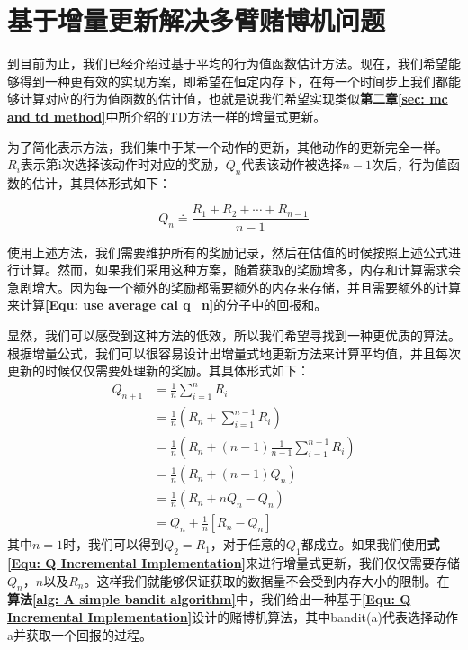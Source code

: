 \section{基于增量更新解决多臂赌博机问题}
到目前为止，我们已经介绍过基于平均的行为值函数估计方法。现在，我们希望能够得到一种更有效的实现方案，即希望在恒定内存下，在每一个时间步上我们都能够计算对应的行为值函数的估计值，也就是说我们希望实现类似\textbf{第二章\ref{sec: mc and td method}}中所介绍的TD方法一样的增量式更新。

为了简化表示方法，我们集中于某一个动作的更新，其他动作的更新完全一样。$R_i$表示第i次选择该动作时对应的奖励，$Q_n$代表该动作被选择$n-1$次后，行为值函数的估计，其具体形式如下：

\begin{equation}
\label{Equ: use average cal q_n}
    Q_{n} \doteq \frac{R_{1}+R_{2}+\cdots+R_{n-1}}{n-1}
\end{equation}

使用上述方法，我们需要维护所有的奖励记录，然后在估值的时候按照上述公式进行计算。然而，如果我们采用这种方案，随着获取的奖励增多，内存和计算需求会急剧增大。因为每一个额外的奖励都需要额外的内存来存储，并且需要额外的计算来计算\textbf{\eqref{Equ: use average cal q_n}}的分子中的回报和。

 显然，我们可以感受到这种方法的低效，所以我们希望寻找到一种更优质的算法。根据增量公式，我们可以很容易设计出增量式地更新方法来计算平均值，并且每次更新的时候仅仅需要处理新的奖励。其具体形式如下：
\begin{equation}
\label{Equ: Q Incremental Implementation}
    \begin{aligned}
Q_{n+1} &=\frac{1}{n} \sum_{i=1}^{n} R_{i} \\
&=\frac{1}{n}\left(R_{n}+\sum_{i=1}^{n-1} R_{i}\right) \\
&=\frac{1}{n}\left(R_{n}+(n-1) \frac{1}{n-1} \sum_{i=1}^{n-1} R_{i}\right) \\
&=\frac{1}{n}\left(R_{n}+(n-1) Q_{n}\right) \\
&=\frac{1}{n}\left(R_{n}+n Q_{n}-Q_{n}\right) \\
&=Q_{n}+\frac{1}{n}\left[R_{n}-Q_{n}\right]
\end{aligned}
\end{equation}
其中$n=1$时，我们可以得到$Q_2=R_1$，对于任意的$Q_1$都成立。如果我们使用\textbf{式\eqref{Equ: Q Incremental Implementation}}来进行增量式更新，我们仅仅需要存储$Q_n$，$n$以及$R_n$。这样我们就能够保证获取的数据量不会受到内存大小的限制。在\textbf{算法\ref{alg: A simple bandit algorithm}}中，我们给出一种基于\textbf{\eqref{Equ: Q Incremental Implementation}}设计的赌博机算法，其中bandit(a)代表选择动作a并获取一个回报的过程。


